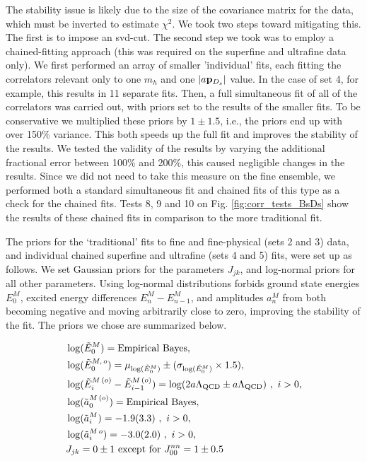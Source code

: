 The stability issue is likely due to the size of the covariance matrix for the data, which must be inverted to estimate $\chi^2$. We took two steps toward mitigating this. The first is to impose an svd-cut. The second step we took was to employ a chained-fitting approach (this was required on the superfine and ultrafine data only). We first performed an array of smaller 'individual' fits, each fitting the correlators relevant only to one $m_h$ and one $|a{\bf{p}}_{D_s}|$ value. In the case of set 4, for example, this results in 11 separate fits. Then, a full simultaneous fit of all of the correlators was carried out, with priors set to the results of the smaller fits. To be conservative we multiplied these priors by $1\pm 1.5$, i.e., the priors end up with over 150\% variance. This both speeds up the full fit and improves the stability of the results. We tested the validity of the results by varying the additional fractional error between 100\% and 200\%, this caused negligible changes in the results. Since we did not need to take this measure on the fine ensemble, we performed both a standard simultaneous fit and chained fits of this type as a check for the chained fits. Tests 8, 9 and 10 on Fig. \ref{fig:corr_tests_BsDs} show the results of these chained fits in comparison to the more traditional fit.

The priors for the `traditional' fits to fine and fine-physical (sets 2 and 3) data, and individual chained superfine and ultrafine (sets 4 and 5) fits, were set up as follows. We set Gaussian priors for the parameters $J_{jk}$, and log-normal priors for all other parameters. Using log-normal distributions forbids ground state energies $E_0^M$, excited energy differences $E_n^M-E_{n-1}^M$, and amplitudes $a_n^M$ from both becoming negative and moving arbitrarily close to zero, improving the stability of the fit. The priors we chose are summarized below.

\begin{align}
  \nonumber
  &\log(\tilde{E}_0^M) = \text{Empirical Bayes}, \\
  \nonumber
  &\log(\tilde{E}_0^{M,\,o}) = \mu_{\log(\tilde{E}_0^M)} \pm (\sigma_{\log(\tilde{E}_0^M)}\times 1.5), \\
  \nonumber
  &\log(\tilde{E}_i^{M\, (o)} - \tilde{E}_{i-1}^{M\, (o)}) = \log( 2a\Lambda_{\text{QCD}} \pm a\Lambda_{\text{QCD}}) \,\,,\,\,i>0 , \\
  \nonumber
  &\log(\tilde{a}_0^{M\,(o)}) = \text{Empirical Bayes}, \\
  \nonumber
  &\log(\tilde{a}_i^{M}) = -1.9(3.3) \,\,,\,\,i>0, \\
  \nonumber
  &\log(\tilde{a}_i^{M\,o}) = -3.0(2.0) \,\,,\,\,i>0, \\
  &J_{jk} = 0\pm 1 \text{ except for } J_{00}^{nn}=1\pm 0.5
\end{align}

